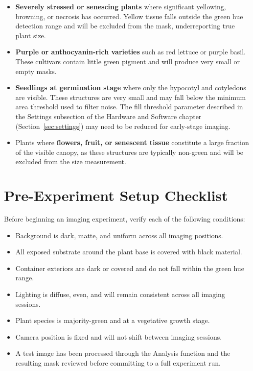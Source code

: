 \documentclass[12pt,a4paper,oneside]{report}
\begin{document}
\begin{itemize}
    \item \textbf{Severely stressed or senescing plants} where significant yellowing, browning, or necrosis has occurred. Yellow tissue falls outside the green hue detection range and will be excluded from the mask, underreporting true plant size.
    \item \textbf{Purple or anthocyanin-rich varieties} such as red lettuce or purple basil. These cultivars contain little green pigment and will produce very small or empty masks.
    \item \textbf{Seedlings at germination stage} where only the hypocotyl and cotyledons are visible. These structures are very small and may fall below the minimum area threshold used to filter noise. The fill threshold parameter described in the Settings subsection of the Hardware and Software chapter (Section~\ref{sec:settings}) may need to be reduced for early-stage imaging.
    \item Plants where \textbf{flowers, fruit, or senescent tissue} constitute a large fraction of the visible canopy, as these structures are typically non-green and will be excluded from the size measurement.
\end{itemize}

\section{Pre-Experiment Setup Checklist}

Before beginning an imaging experiment, verify each of the following conditions:

\begin{itemize}
    \item[\Square] Background is dark, matte, and uniform across all imaging positions.
    \item[\Square] All exposed substrate around the plant base is covered with black material.
    \item[\Square] Container exteriors are dark or covered and do not fall within the green hue range.
    \item[\Square] Lighting is diffuse, even, and will remain consistent across all imaging sessions.
    \item[\Square] Plant species is majority-green and at a vegetative growth stage.
    \item[\Square] Camera position is fixed and will not shift between imaging sessions.
    \item[\Square] A test image has been processed through the Analysis function and the resulting mask reviewed before committing to a full experiment run.
\end{itemize}
\end{document}

